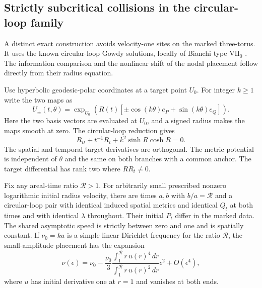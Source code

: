 \subsection{Strictly subcritical collisions in the circular-loop family}
\label{sec:circular-loop}
A distinct exact construction avoids velocity-one sites on
the marked three-torus. It uses the known circular-loop
Gowdy solutions, locally of Bianchi type $\mathrm{VII}_0$
\cite[Section~3]{rendall-twisted} \cite{grubisic}.
The information comparison and the nonlinear shift of the
nodal placement follow directly from their radius equation.

Use hyperbolic geodesic-polar coordinates at a target point
$U_0$. For integer $k\ge1$ write the two maps as
\[
 U_\pm(t,\theta)=\exp_{U_0}\!\left(
 R(t)[\pm\cos(k\theta)e_P+\sin(k\theta)e_Q]\right).
\]
Here the two basis vectors are evaluated at $U_0$,
and a signed radius makes the maps smooth at zero.
The circular-loop reduction gives
\begin{equation}
 R_{tt}+t^{-1}R_t+k^2\sinh R\cosh R=0.
 \label{eq:circular-ode}
\end{equation}
The spatial and temporal target derivatives are orthogonal.
The metric potential is independent of $\theta$ and
the same on both branches with a common anchor.
The target differential has rank two where
$R R_t\ne0$.

\begin{proposition}
\label{prop:circular-loop}
Fix any areal-time ratio $\mathcal R>1$.
For arbitrarily small prescribed nonzero logarithmic
initial radius velocity, there are times $a,b$ with
$b/a=\mathcal R$ and a circular-loop pair with
identical induced spatial metrics and identical $Q_t$
at both times and with identical $\lambda$ throughout.
Their initial $P_t$ differ in the marked data.
The shared asymptotic speed is strictly between zero
and one and is spatially constant.
If $\nu_0=ka$ is a simple linear Dirichlet frequency
for the ratio $\mathcal R$, the small-amplitude
placement has the expansion
\[
 \nu(\epsilon)=\nu_0-
       \frac{\nu_0}{3}
        \frac{\int_1^{\mathcal R} r\,u(r)^4\,dr}
             {\int_1^{\mathcal R} r\,u(r)^2\,dr}
              \epsilon^2+O(\epsilon^4),
\]
where $u$ has initial derivative one at $r=1$ and
vanishes at both ends.
\end{proposition}


